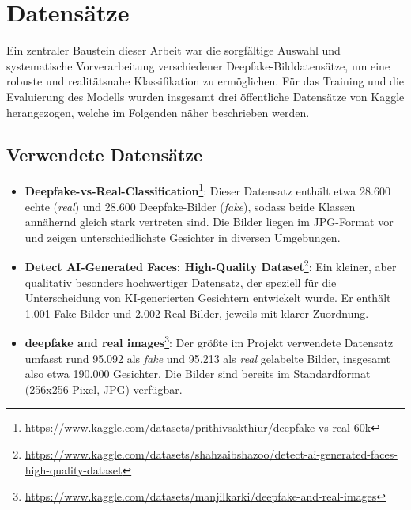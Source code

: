 \chapter{Datensätze}
\label{chap:datensaetze}

Ein zentraler Baustein dieser Arbeit war die sorgfältige Auswahl und systematische Vorverarbeitung verschiedener Deepfake-Bilddatensätze, um eine robuste und realitätsnahe Klassifikation zu ermöglichen. Für das Training und die Evaluierung des Modells wurden insgesamt drei öffentliche Datensätze von Kaggle herangezogen, welche im Folgenden näher beschrieben werden.

\section{Verwendete Datensätze}

\begin{itemize}
    \item \textbf{Deepfake-vs-Real-Classification}\footnote{\url{https://www.kaggle.com/datasets/prithivsakthiur/deepfake-vs-real-60k}}:  
    Dieser Datensatz enthält etwa 28.600 echte (\emph{real}) und 28.600 Deepfake-Bilder (\emph{fake}), sodass beide Klassen annähernd gleich stark vertreten sind. Die Bilder liegen im JPG-Format vor und zeigen unterschiedlichste Gesichter in diversen Umgebungen.

    \item \textbf{Detect AI-Generated Faces: High-Quality Dataset}\footnote{\url{https://www.kaggle.com/datasets/shahzaibshazoo/detect-ai-generated-faces-high-quality-dataset}}:  
    Ein kleiner, aber qualitativ besonders hochwertiger Datensatz, der speziell für die Unterscheidung von KI-generierten Gesichtern entwickelt wurde. Er enthält 1.001 Fake-Bilder und 2.002 Real-Bilder, jeweils mit klarer Zuordnung.

    \item \textbf{deepfake and real images}\footnote{\url{https://www.kaggle.com/datasets/manjilkarki/deepfake-and-real-images}}:  
    Der größte im Projekt verwendete Datensatz umfasst rund 95.092 als \emph{fake} und 95.213 als \emph{real} gelabelte Bilder, insgesamt also etwa 190.000 Gesichter. Die Bilder sind bereits im Standardformat (256x256 Pixel, JPG) verfügbar.
\end{itemize}

